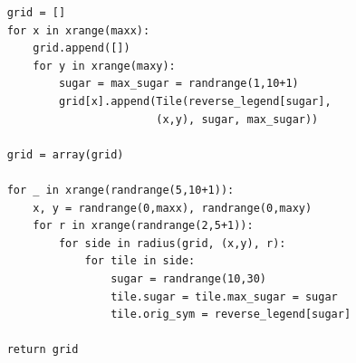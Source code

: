\begin{verbatim}
    grid = []
    for x in xrange(maxx):
        grid.append([])
        for y in xrange(maxy):
            sugar = max_sugar = randrange(1,10+1)
            grid[x].append(Tile(reverse_legend[sugar], 
                           (x,y), sugar, max_sugar))
    
    grid = array(grid)
    
    for _ in xrange(randrange(5,10+1)):
        x, y = randrange(0,maxx), randrange(0,maxy)
        for r in xrange(randrange(2,5+1)):
            for side in radius(grid, (x,y), r):
                for tile in side:
                    sugar = randrange(10,30)
                    tile.sugar = tile.max_sugar = sugar
                    tile.orig_sym = reverse_legend[sugar]
    
    return grid    
\end{verbatim}
\newpage

